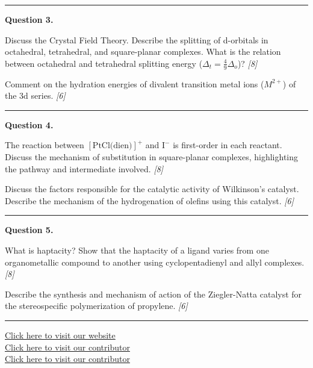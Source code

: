 \documentclass[11pt,a4paper]{article}
\newcommand{\pts}[1]{\hfill   \textit{[#1]}}
\begin{document}
\medskip\rule{\linewidth}{0.2pt}




\noindent   \textbf{Question 3.}

\begin{parts}
  \item Discuss the Crystal Field Theory. Describe the splitting of d-orbitals in octahedral, tetrahedral, and square-planar complexes. What is the relation between octahedral and tetrahedral splitting energy ($\Delta_t = \frac{4}{9}\Delta_o$)? \pts{8}
  \item Comment on the hydration energies of divalent transition metal ions ($M^{2+}$) of the $3 \text{d}$ series. \pts{6}
\end{parts}

\medskip\rule{\linewidth}{0.2pt}




\noindent   \textbf{Question 4.}

\begin{parts}
  \item The reaction between $[ \text{PtCl(dien)}]^+$ and $ \text{I}^-$ is first-order in each reactant. Discuss the mechanism of substitution in square-planar complexes, highlighting the pathway and intermediate involved. \pts{8}
  \item Discuss the factors responsible for the catalytic activity of Wilkinson's catalyst. Describe the mechanism of the hydrogenation of olefins using this catalyst. \pts{6}
\end{parts}

\medskip\rule{\linewidth}{0.2pt}




\noindent   \textbf{Question 5.}

\begin{parts}
  \item What is haptacity? Show that the haptacity of a ligand varies from one organometallic compound to another using cyclopentadienyl and allyl complexes. \pts{8}
  \item Describe the synthesis and mechanism of action of the Ziegler-Natta catalyst for the stereospecific polymerization of propylene. \pts{6}
\end{parts}

\vfill
\rule{\linewidth}{0.4pt}

\begin{center}\small
  \href{https://bhu-exam.vercel.app/}{Click here to visit our website}\\[4pt]
  \href{https://me-aryan.vercel.app/}{Click here to visit our contributor}\\[4pt]
  \href{https://quashan-me.vercel.app/}{Click here to visit our contributor}
\end{center}
\end{document}
